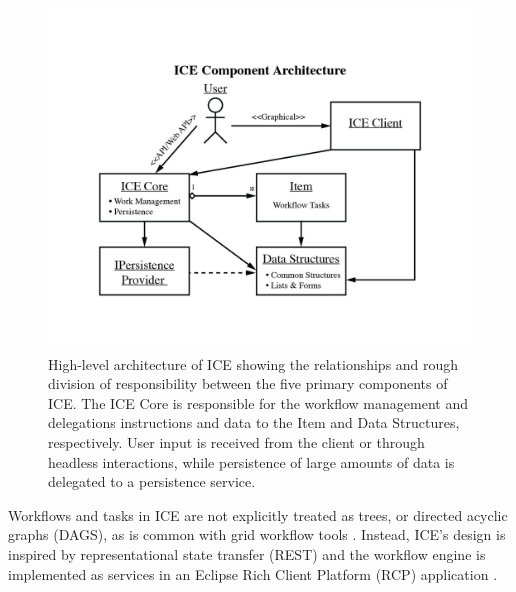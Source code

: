 \begin{figure}[htbp]
\centering
\includegraphics[width=\textwidth]{src/images/ICE-arch-1.jpg}
\caption{High-level architecture of ICE showing the relationships and rough division of responsibility between the five primary components of ICE. The ICE Core is responsible for the workflow management and delegations instructions and data to the Item and Data Structures, respectively. User input is received from the client or through headless interactions, while persistence of large amounts of data is delegated to a persistence service.}
\label{highlevel-arch}
\end{figure}

Workflows and tasks in ICE are not explicitly treated as trees, or
directed acyclic graphs (DAGS), as is common with grid workflow tools
\cite{yu_taxonomy_2005}. Instead, ICE's design is inspired by representational
state transfer (REST) and the workflow engine is implemented as services in an Eclipse Rich Client Platform (RCP) application
\cite{fielding_architectural_2000} \cite{mcaffer_eclipse_2010}.

